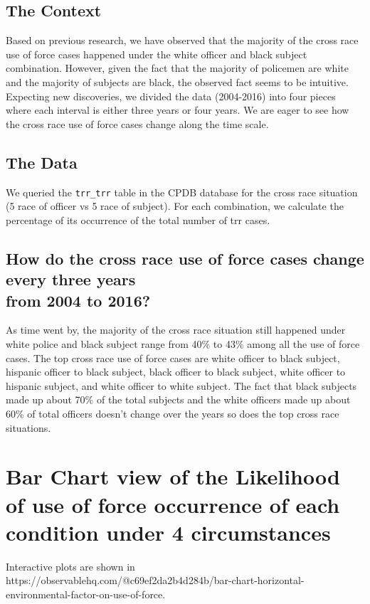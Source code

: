 \documentclass[10pt]{article}
\begin{document}
\subsection{The Context}

Based on previous research, we have observed that the majority of the cross race use of force cases happened under the white officer and black subject combination. However, given the fact that the majority of policemen are white and the majority of subjects are black, the observed fact seems to be intuitive. Expecting new discoveries, we divided the data (2004-2016) into four pieces where each interval is either three years or four years. We are eager to see how the cross race use of force cases change along the time scale.

\subsection{The Data}

We queried the \texttt{trr\_trr} table in the CPDB database for the cross race situation (5 race of officer vs 5 race of subject). For each combination, we calculate the percentage of its occurrence of the total number of trr cases.

\subsection{How do the cross race use of force cases change every three years \\ from 2004 to 2016?}

As time went by, the majority of the cross race situation still happened under white police and black subject range from 40\% to 43\% among all the use of force cases. The top cross race use of force cases are white officer to black subject, hispanic officer to black subject, black officer to black subject, white officer to hispanic subject, and white officer to white subject. The fact that black subjects made up about 70\% of the total subjects and the white officers made up about 60\% of total officers doesn’t change over the years so does the top cross race situations.


\section{Bar Chart view of the Likelihood of use of force occurrence of each condition under 4 circumstances}

Interactive plots are shown in \\ https://observablehq.com/@c69ef2da2b4d284b/bar-chart-horizontal-environmental-factor-on-use-of-force.
\end{document}
